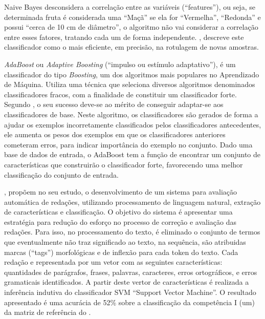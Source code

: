 \noindent Naive Bayes desconsidera a correlação entre 
as variáveis (``features''), ou seja, se determinada fruta é considerada uma 
``Maçã'' se ela for ``Vermelha'', ``Redonda'' e possui ``cerca de 10 cm 
de diâmetro'', o algoritmo não vai considerar a correlação entre esses fatores, 
tratando cada um de forma independente. 
, descreve este classificador como o mais 
eficiente, em precisão, na rotulagem de novas amostras. 

\textit{AdaBoost} ou \textit{Adaptive Boosting} (``impulso ou estímulo 
adaptativo''), é um classificador do tipo \textit{Boosting}, um dos algoritmos 
mais populares no Aprendizado de Máquina. Utiliza uma técnica que seleciona 
diversos algoritmos denominados classificadores fracos, com a finalidade de 
constituir um classificador forte. Segundo , o seu 
sucesso deve-se ao mérito de conseguir adaptar-se aos classificadores de base. 
Neste algoritmo, os classificadores são gerados de forma a ajudar os exemplos 
incorretamente classificados pelos classificadores antecedentes, ele aumenta os 
pesos dos exemplos em que os classificadores anteriores cometeram erros, para 
indicar importância do exemplo no conjunto. Dado uma base de dados de entrada, 
o AdaBoost tem a função de encontrar um conjunto de características que 
construirão o classificador forte, favorecendo uma melhor classificação do 
conjunto de entrada.

, propõem no seu estudo, o desenvolvimento de um 
sistema para avaliação automática de redações, utilizando processamento de 
linguagem natural, extração de características e classificação. O objetivo do 
sistema é apresentar uma estratégia para redução do esforço no processo de 
correção e avaliação das redações. Para isso, no processamento do texto, é 
eliminado o conjunto de termos que eventualmente não traz significado ao 
texto, na sequência, são atribuidas marcas (``tags'') morfológicas e de inflexão 
para cada token do texto. Cada redação e representada por um vetor com as 
seguintes características: quantidades de parágrafos, frases, palavras, 
caracteres, erros ortográficos, e erros gramaticais identificados. A partir 
deste vertor de características é realizada a inferência indutiva do 
classificador SVM ``Support Vector Machine''. O resultado apresentado é uma 
acurácia de 52\% sobre a classificação da competência I (um) da matriz de 
referência do \citeauthor{edital_enem:2016}.